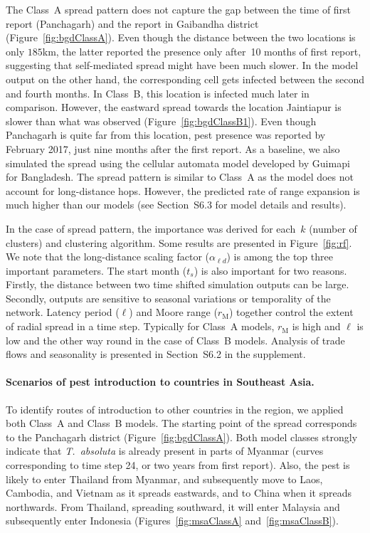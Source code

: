 \documentclass[11pt]{article}
\newcommand{\tuta}{\emph{T.~absoluta}}
\newcommand{\ald}{\alpha_{\ell d}}
\newcommand{\mooreRange}{r_\mathrm{M}}
\theoremstyle{definition}
\begin{document}
The Class~A spread pattern does not capture the gap between the time of first
report (Panchagarh) and the report in Gaibandha district
(Figure~\ref{fig:bgdClassA}). Even though the distance between the two
locations is only $185$km, the latter reported the presence only after~10
months of first report, suggesting that self-mediated spread might have been
much slower. In the model output on the other hand, the corresponding cell
gets infected between the second and fourth months.  In Class~B, this
location is infected much later in comparison. However, the eastward spread
towards the location Jaintiapur is slower than what was observed
(Figure~\ref{fig:bgdClassB1}). Even though Panchagarh is quite far from
this location, pest presence was reported by February 2017, just nine
months after the first report.  As a baseline, we also simulated the spread
using the cellular automata model developed by
Guimapi~\cite{guimapi2016modeling} for Bangladesh. The spread pattern is
similar to Class~A as the model does not account for long-distance hops.
However, the predicted rate of range expansion is much higher than our
models (see Section~S6.3 for model details and results).

In the case of spread pattern, the
importance was derived for each~$k$ (number of clusters) and clustering
algorithm. Some results are presented in Figure~\ref{fig:rf}. We note that
the long-distance scaling factor ($\ald$) is among the top three important
parameters. The start month ($t_s$) is also important for two reasons.
Firstly, the distance between two time shifted simulation outputs can be
large. Secondly, outputs are sensitive to seasonal variations or
temporality of the network.  Latency period ($\ell$) and Moore range
($\mooreRange$) together control the extent of radial spread in a time
step. Typically for Class~A models, $\mooreRange$ is high and $\ell$ is
low and the other way round in the case of Class~B models. Analysis of
trade flows and seasonality is presented in
Section~S6.2 in the supplement.

\paragraph{Scenarios of pest introduction to countries in Southeast Asia.}
To identify routes of introduction to other countries in the region, we
applied both Class~A and Class~B models. The starting point of the spread
corresponds to the Panchagarh district (Figure~\ref{fig:bgdClassA}). Both model
classes strongly indicate that \tuta{} is already present in parts of
Myanmar (curves corresponding to time step 24, or two years from first
report). Also, the pest is likely to enter Thailand from Myanmar, and
subsequently move to Laos, Cambodia, and Vietnam as it spreads eastwards, and
to China when it spreads northwards. From Thailand, spreading southward, it
will enter Malaysia and subsequently enter Indonesia
(Figures~\ref{fig:msaClassA} and~\ref{fig:msaClassB}).
\end{document}
